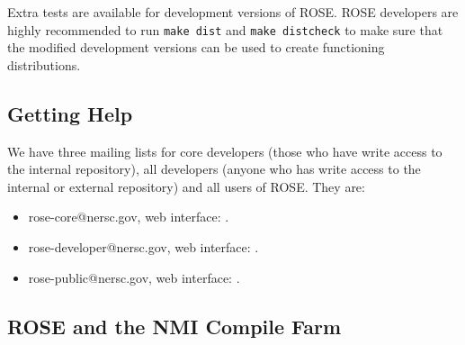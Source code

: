 Extra tests are available for development versions of ROSE. ROSE developers
are highly recommended to run {\tt make dist} and {\tt make distcheck} to make
sure that the modified development versions can be used to create functioning
distributions.

\subsection{Getting Help}

%

We have three mailing lists for core developers (those who have write access to
the internal repository), all developers (anyone who has write access to the
internal or external repository) and all
users of ROSE. They are:
\begin{itemize}
\item rose-core@nersc.gov, web interface: 
.
\item rose-developer@nersc.gov, web interface: 
.
\item rose-public@nersc.gov, web interface:
.
\end{itemize}



\subsection{ROSE and the NMI Compile Farm}
\label{NMI_testing}

